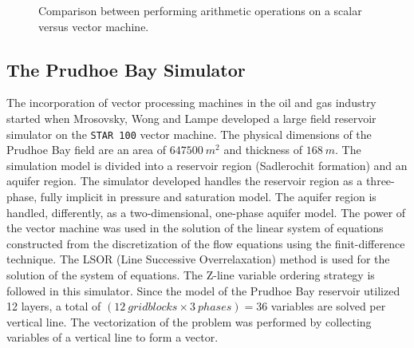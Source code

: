 \documentclass[barcolor=BrickRed,nocopyright,nolists]{asmejour}
\begin{document}
\begin{figure}[h]
	\hspace*{-2cm}
	\hbox{}
	\caption{Comparison between performing arithmetic operations on a scalar versus vector machine.}
	\label{vec}
\end{figure}

\subsection{The Prudhoe Bay Simulator}
The incorporation of vector processing machines in the oil and gas industry started when Mrosovsky, Wong and Lampe\cite{spe8330} developed a large field reservoir simulator on the \texttt{STAR 100} vector machine.
The physical dimensions of the Prudhoe Bay field are an area of $647500 \ m^{2}$ and thickness of $168 \ m$. The simulation model is divided into a reservoir region (Sadlerochit formation) and an aquifer region. The simulator developed handles the reservoir 
region as a three-phase, fully implicit in pressure and saturation model. The aquifer region is handled, differently, as a two-dimensional, one-phase aquifer model.  The power of the vector machine was used
in the solution of the linear system of equations constructed from the discretization of the flow equations using the finit-difference technique. The LSOR (Line Successive Overrelaxation) method is used for the solution of the system of equations. The
Z-line variable ordering strategy is followed in this simulator. Since the model of the Prudhoe Bay reservoir utilized 12 layers, a total of $(12 \ gridblocks \times 3 \ phases) = 36$ variables are solved per vertical line. The vectorization of the problem was
performed by collecting variables of a vertical line to form a vector. 
\end{document}
